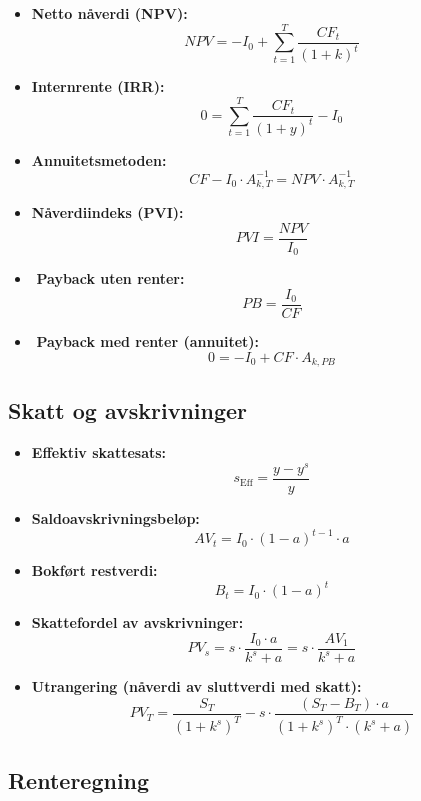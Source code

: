 \documentclass[
  11pt,
  a4paper,
]{article}
\begin{document}
\begin{itemize}
\item
  \textbf{Netto nåverdi (NPV):}\\
  \[
  NPV = - I_0 + \sum_{t = 1}^{T} \frac{CF_t}{(1 + k)^t} 
  \]
\item
  \textbf{Internrente (IRR):}\\
  \[
  0 = \sum_{t = 1}^{T} \frac{CF_t}{(1 + y)^t} - I_0
  \]
\item
  \textbf{Annuitetsmetoden:}\\
  \[
  CF - I_{0} \cdot A_{k,T}^{-1} = NPV \cdot A_{k,T}^{-1}
  \]
\item
  \textbf{Nåverdiindeks (PVI):}\\
  \[
  PVI = \frac{NPV}{I_0}
  \]
\item
  ️ \textbf{Payback uten renter:}\\
  \[
  PB = \frac{I_0}{CF}
  \]
\item
  ️ \textbf{Payback med renter (annuitet):}\\
  \[
  0 = -I_0 + CF \cdot A_{k, PB}
  \]
\end{itemize}

\subsection{Skatt og avskrivninger}\label{skatt-og-avskrivninger}

\begin{itemize}
\item
  \textbf{Effektiv skattesats:}\\
  \[
  s_{\text{Eff}} = \frac{y - y^s}{y}
  \]
\item
  \textbf{Saldoavskrivningsbeløp:}\\
  \[
  AV_t = I_0 \cdot (1 - a)^{t - 1} \cdot a
  \]
\item
  \textbf{Bokført restverdi:}\\
  \[
  B_t = I_0 \cdot (1 - a)^t
  \]
\item
  \textbf{Skattefordel av avskrivninger:}\\
  \[
  PV_s = s \cdot \frac{I_0 \cdot a}{k^s + a} = s \cdot \frac{AV_1}{k^s + a}
  \]
\item
  \textbf{Utrangering (nåverdi av sluttverdi med skatt):}\\
  \[
  PV_T = \frac{S_T}{(1 + k^s)^T} - s \cdot \frac{(S_T - B_T) \cdot a}{(1 + k^s)^T \cdot (k^s + a)}
  \]
\end{itemize}

\subsection{Renteregning}\label{renteregning}
\end{document}
